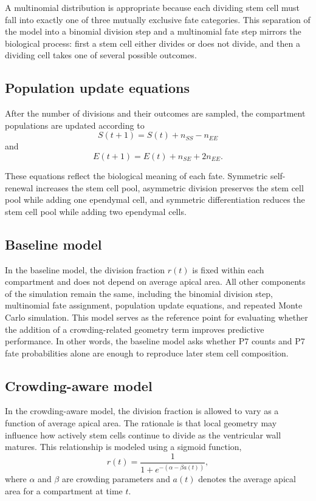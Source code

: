 \documentclass[12pt]{article}
\begin{document}
A multinomial distribution is appropriate because each dividing stem cell must fall into exactly one of three mutually exclusive fate categories. This separation of the model into a binomial division step and a multinomial fate step mirrors the biological process: first a stem cell either divides or does not divide, and then a dividing cell takes one of several possible outcomes.

\subsection{Population update equations}

After the number of divisions and their outcomes are sampled, the compartment populations are updated according to
\[
S(t+1)=S(t)+n_{SS}-n_{EE}
\]
and
\[
E(t+1)=E(t)+n_{SE}+2n_{EE}.
\]

These equations reflect the biological meaning of each fate. Symmetric self-renewal increases the stem cell pool, asymmetric division preserves the stem cell pool while adding one ependymal cell, and symmetric differentiation reduces the stem cell pool while adding two ependymal cells.

\subsection{Baseline model}

In the baseline model, the division fraction $r(t)$ is fixed within each compartment and does not depend on average apical area. All other components of the simulation remain the same, including the binomial division step, multinomial fate assignment, population update equations, and repeated Monte Carlo simulation. This model serves as the reference point for evaluating whether the addition of a crowding-related geometry term improves predictive performance. In other words, the baseline model asks whether P7 counts and P7 fate probabilities alone are enough to reproduce later stem cell composition.

\subsection{Crowding-aware model}

In the crowding-aware model, the division fraction is allowed to vary as a function of average apical area. The rationale is that local geometry may influence how actively stem cells continue to divide as the ventricular wall matures. This relationship is modeled using a sigmoid function,
\[
r(t)=\frac{1}{1+e^{-(\alpha-\beta a(t))}},
\]
where $\alpha$ and $\beta$ are crowding parameters and $a(t)$ denotes the average apical area for a compartment at time $t$.
\end{document}
